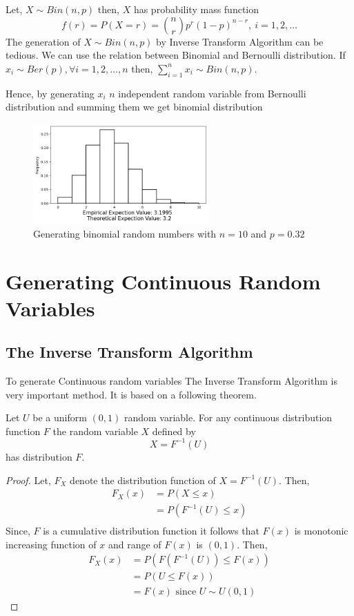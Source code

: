 \begin{example}
	Let, $X\sim Bin(n,p)$ then,  $X$ has probability mass function
	\[
		f(r) = P(X=r) = {n\choose r}p^{r}(1-p)^{n-r},\  i = 1,2, \ldots
	\]
	The generation of $X\sim Bin(n,p)$ by Inverse Transform Algorithm can be tedious. We can use the relation between Binomial and Bernoulli distribution.
	If $x_i \sim Ber(p), \forall i = 1,2, \ldots, n$ then, $\sum_{i=1}^{n} x_i\sim Bin(n,p)$.

	Hence, by generating $x_i$ $n$ independent random variable from Bernoulli distribution and summing them we get binomial distribution
	\begin{figure}[H]
		\centering
		\includegraphics[width=0.6\textwidth]{images/bin_ITA.png}
		\caption{Generating  binomial random numbers with $n=10$ and  $p=0.32$}
	\end{figure}
\end{example}

\section{Generating Continuous Random Variables}

\subsection{The Inverse Transform Algorithm}
To generate Continuous random variables The Inverse Transform Algorithm is very important method. It is based on a following theorem.
\begin{theorem}
	\label{ITA theorem}
	Let $U$ be a uniform  $(0,1)$ random variable. For any continuous distribution function  $F$ the random variable  $X$ defined by
	\[
		X=F^{-1}(U)
	\]
	has distribution $F$.
\end{theorem}
\begin{proof}
	Let, $F_X$ denote the distribution function of  $X=F^{-1}(U)$. Then,
	\begin{align*}
		F_X(x) & = P(X\le x)         \\
		       & = P(F^{-1}(U)\le x) \\
	\end{align*}
	Since, $F$ is a cumulative distribution function it follows that $F(x)$ is monotonic increasing function of  $x$ and range of  $F(x)$ is  $(0,1)$.
	Then,
	\begin{align*}
		F_X(x) & = P\left(F\left(F^{-1}(U)\right)\le F(x)\right) \\
		       & = P(U\le F(x))                                  \\
		       & = F(x) \text{ since $U\sim U(0,1)$ }
	\end{align*}
\end{proof}

